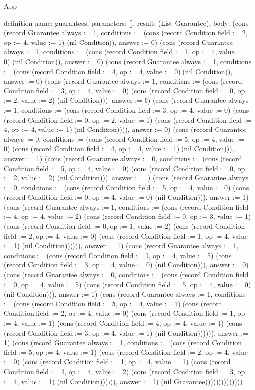 \begin{lexlean}{App}
\begin{semanticmodule}
definition{
  name: guarantees,
  parameters: [],
  result: (List Guarantee),
  body: (cons (record Guarantee {always := 1, conditions := (cons (record Condition {field := 2, op := 4, value := 1}) (nil Condition)), answer := 0}) (cons (record Guarantee {always := 1, conditions := (cons (record Condition {field := 1, op := 4, value := 0}) (nil Condition)), answer := 0}) (cons (record Guarantee {always := 1, conditions := (cons (record Condition {field := 4, op := 4, value := 0}) (nil Condition)), answer := 0}) (cons (record Guarantee {always := 1, conditions := (cons (record Condition {field := 3, op := 4, value := 0}) (cons (record Condition {field := 0, op := 2, value := 2}) (nil Condition))), answer := 0}) (cons (record Guarantee {always := 1, conditions := (cons (record Condition {field := 3, op := 4, value := 0}) (cons (record Condition {field := 0, op := 2, value := 1}) (cons (record Condition {field := 4, op := 4, value := 1}) (nil Condition)))), answer := 0}) (cons (record Guarantee {always := 0, conditions := (cons (record Condition {field := 5, op := 4, value := 0}) (cons (record Condition {field := 4, op := 4, value := 1}) (nil Condition))), answer := 1}) (cons (record Guarantee {always := 0, conditions := (cons (record Condition {field := 5, op := 4, value := 0}) (cons (record Condition {field := 0, op := 2, value := 2}) (nil Condition))), answer := 1}) (cons (record Guarantee {always := 0, conditions := (cons (record Condition {field := 5, op := 4, value := 0}) (cons (record Condition {field := 0, op := 4, value := 0}) (nil Condition))), answer := 1}) (cons (record Guarantee {always := 1, conditions := (cons (record Condition {field := 4, op := 4, value := 2}) (cons (record Condition {field := 0, op := 3, value := 1}) (cons (record Condition {field := 0, op := 1, value := 2}) (cons (record Condition {field := 2, op := 4, value := 0}) (cons (record Condition {field := 1, op := 4, value := 1}) (nil Condition)))))), answer := 1}) (cons (record Guarantee {always := 1, conditions := (cons (record Condition {field := 0, op := 4, value := 5}) (cons (record Condition {field := 3, op := 4, value := 0}) (nil Condition))), answer := 0}) (cons (record Guarantee {always := 0, conditions := (cons (record Condition {field := 0, op := 4, value := 5}) (cons (record Condition {field := 5, op := 4, value := 0}) (nil Condition))), answer := 1}) (cons (record Guarantee {always := 1, conditions := (cons (record Condition {field := 5, op := 4, value := 1}) (cons (record Condition {field := 2, op := 4, value := 0}) (cons (record Condition {field := 1, op := 4, value := 1}) (cons (record Condition {field := 4, op := 4, value := 1}) (cons (record Condition {field := 3, op := 4, value := 1}) (nil Condition)))))), answer := 1}) (cons (record Guarantee {always := 1, conditions := (cons (record Condition {field := 5, op := 4, value := 1}) (cons (record Condition {field := 2, op := 4, value := 0}) (cons (record Condition {field := 1, op := 4, value := 1}) (cons (record Condition {field := 4, op := 4, value := 2}) (cons (record Condition {field := 3, op := 4, value := 1}) (nil Condition)))))), answer := 1}) (nil Guarantee))))))))))))))
}


\end{semanticmodule}
\end{lexlean}
